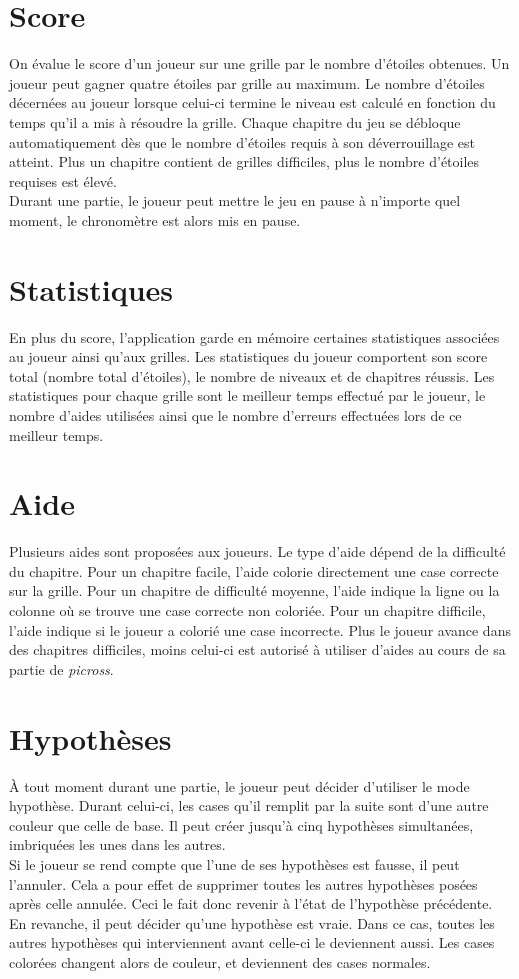 \documentclass{report}
\begin{document}
		\section{Score}
			On évalue le score d'un joueur sur une grille par le nombre d'étoiles obtenues. Un joueur peut gagner quatre étoiles par grille au maximum. Le nombre d'étoiles décernées au joueur lorsque celui-ci termine le niveau est calculé en fonction du temps qu'il a mis à résoudre la grille. Chaque chapitre du jeu se débloque automatiquement dès que le nombre d'étoiles requis à son déverrouillage est atteint. Plus un chapitre contient de grilles difficiles, plus le nombre d'étoiles requises est élevé.\\
			Durant une partie, le joueur peut mettre le jeu en pause à n'importe quel moment, le chronomètre est alors mis en pause.

				
		\section{Statistiques}
			En plus du score, l'application garde en mémoire certaines statistiques associées au joueur ainsi qu'aux grilles. Les statistiques du joueur comportent son score total (nombre total d'étoiles), le nombre de niveaux et de chapitres réussis. Les statistiques pour chaque grille sont le meilleur temps effectué par le joueur, le nombre d'aides utilisées ainsi que le nombre d'erreurs effectuées lors de ce meilleur temps.

			
		\section{Aide}
			Plusieurs aides sont proposées aux joueurs. Le type d'aide dépend de la difficulté du chapitre. Pour un chapitre facile, l'aide colorie directement une case correcte sur la grille. Pour un chapitre de difficulté moyenne, l'aide indique la ligne ou la colonne où se trouve une case correcte non coloriée. Pour un chapitre difficile, l'aide indique si le joueur a colorié une case incorrecte. Plus le joueur avance dans des chapitres difficiles, moins celui-ci est autorisé à utiliser d'aides au cours de sa partie de \textit{picross}.

		\section{Hypothèses}			
			À tout moment durant une partie, le joueur peut décider d'utiliser le mode hypothèse. Durant celui-ci, les cases qu'il remplit par la suite sont d'une autre couleur que celle de base. Il peut créer jusqu'à cinq hypothèses simultanées, imbriquées les unes dans les autres.\\
			Si le joueur se rend compte que l'une de ses hypothèses est fausse, il peut l'annuler. Cela a pour effet de supprimer toutes les autres hypothèses posées après celle annulée. Ceci le fait donc revenir à l'état de l'hypothèse précédente.\\
			En revanche, il peut décider qu'une hypothèse est vraie. Dans ce cas, toutes les autres hypothèses qui interviennent avant celle-ci le deviennent aussi. Les cases colorées changent alors de couleur, et deviennent des cases normales.
		
\end{document}
